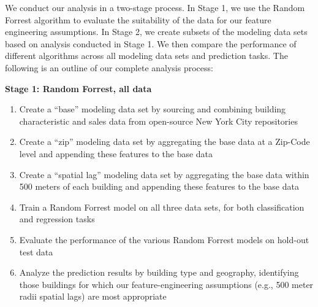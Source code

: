 \documentclass[12pt,]{article}
\providecommand{\tightlist}{%
  \setlength{\itemsep}{0pt}\setlength{\parskip}{0pt}}
\begin{document}
\begin{table}

\caption{\label{tab:model table}\label{tab:modeltable} Six Predictive Models}
\centering
{}
\end{table}

We conduct our analysis in a two-stage process. In Stage 1, we use the
Random Forrest algorithm to evaluate the suitability of the data for our
feature engineering assumptions. In Stage 2, we create subsets of the
modeling data sets based on analysis conducted in Stage 1. We then
compare the performance of different algorithms across all modeling data
sets and prediction tasks. The following is an outline of our complete
analysis process:\newline

\noindent \textbf{Stage 1: Random Forrest, all data}

\begin{enumerate}
\def\labelenumi{\arabic{enumi})}
\tightlist
\item
  Create a ``base'' modeling data set by sourcing and combining building
  characteristic and sales data from open-source New York City
  repositories
\item
  Create a ``zip'' modeling data set by aggregating the base data at a
  Zip-Code level and appending these features to the base data
\item
  Create a ``spatial lag'' modeling data set by aggregating the base
  data within 500 meters of each building and appending these features
  to the base data
\item
  Train a Random Forrest model on all three data sets, for both
  classification and regression tasks
\item
  Evaluate the performance of the various Random Forrest models on
  hold-out test data
\item
  Analyze the prediction results by building type and geography,
  identifying those buildings for which our feature-engineering
  assumptions (e.g., 500 meter radii spatial lags) are most
  appropriate\newline
\end{enumerate}
\end{document}
